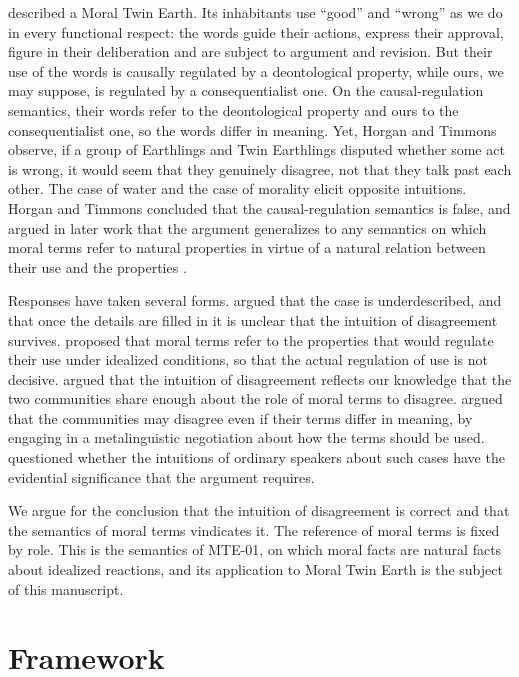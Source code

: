 \documentclass{situationist-preprint}
\begin{document}
\citet{HorganTimmons1991} described a Moral Twin Earth. Its inhabitants use \enquote{good} and \enquote{wrong} as we do in every functional respect: the words guide their actions, express their approval, figure in their deliberation and are subject to argument and revision. But their use of the words is causally regulated by a deontological property, while ours, we may suppose, is regulated by a consequentialist one. On the causal-regulation semantics, their words refer to the deontological property and ours to the consequentialist one, so the words differ in meaning. Yet, Horgan and Timmons observe, if a group of Earthlings and Twin Earthlings disputed whether some act is wrong, it would seem that they genuinely disagree, not that they talk past each other. The case of water and the case of morality elicit opposite intuitions. Horgan and Timmons concluded that the causal-regulation semantics is false, and argued in later work that the argument generalizes to any semantics on which moral terms refer to natural properties in virtue of a natural relation between their use and the properties \citep{HorganTimmons1992a,HorganTimmons1992b}.

Responses have taken several forms. \citet{Copp2000} argued that the case is underdescribed, and that once the details are filled in it is unclear that the intuition of disagreement survives. \citet{Merli2002} proposed that moral terms refer to the properties that would regulate their use under idealized conditions, so that the actual regulation of use is not decisive. \citet{vanRoojen2006} argued that the intuition of disagreement reflects our knowledge that the two communities share enough about the role of moral terms to disagree. \citet{PlunkettSundell2013} argued that the communities may disagree even if their terms differ in meaning, by engaging in a metalinguistic negotiation about how the terms should be used. \citet{Dowell2016} questioned whether the intuitions of ordinary speakers about such cases have the evidential significance that the argument requires.

We argue for the conclusion that the intuition of disagreement is correct and that the semantics of moral terms vindicates it. The reference of moral terms is fixed by role. This is the semantics of MTE-01, on which moral facts are natural facts about idealized reactions, and its application to Moral Twin Earth is the subject of this manuscript.

\section{Framework}
\end{document}
